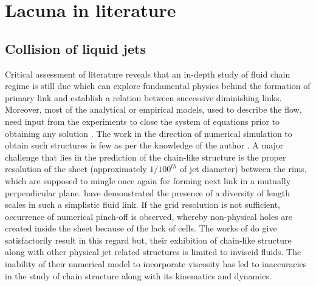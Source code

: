 \section{Lacuna in literature}
\subsection{Collision of liquid jets}
Critical assessment of literature reveals that an in-depth study of fluid chain regime is still due which can explore fundamental physics behind the formation of primary link and establish a relation between successive diminishing links. Moreover, most of the analytical or empirical models, used to describe the flow, need input from the experiments to close the system of equations prior to obtaining any solution \citep{bush2004collision}. The work in the direction of numerical simulation to obtain such structures is few as per the knowledge of the author \citep{chen2013high,da2016surface}. A major challenge that lies in the prediction of the chain-like structure is the proper resolution of the sheet (approximately $1/100^{th}$ of jet diameter) between the rims, which are supposed to mingle once again for forming next link in a mutually perpendicular plane. \citet{chen2013high} have demonstrated the presence of a diversity of length scales in such a simplistic fluid link. If the grid resolution is not sufficient, occurrence of numerical pinch-off is observed, whereby non-physical holes are created inside the sheet because of the lack of cells. The works of \citet{da2016surface} do give satisfactorily result in this regard but, their exhibition of chain-like structure along with other physical jet related structures is limited to inviscid fluids. The inability of their numerical model to incorporate viscosity has led to inaccuracies in the study of chain structure along with its kinematics and dynamics.
